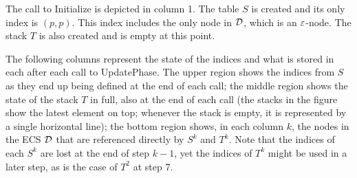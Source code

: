 \begin{example}
\begin{center}
	\end{center}
	The call to {\sc Initialize} is depicted in column 1. The table $S$ is created and its only index is $(p,p)$. This index includes the only node in $\mathcal{D}$, which is an $\varepsilon$-node. The stack $T$ is also created and is empty at this point.
	
	The following columns represent the state of the indices and what is stored in each after each call to {\sc UpdatePhase}. The upper region shows the indices from $S$ as they end up being defined at the end of each call; the middle region shows the state of the stack $T$ in full, also at the end of each call (the stacks in the figure show the latest element on top; whenever the stack is empty, it is represented by a single horizontal line); the bottom region shows, in each column $k$, the nodes in the ECS $\mathcal{D}$ that are referenced directly by $S^k$ and $T^k$. Note that the indices of each $S^k$ are lost at the end of step $k-1$, yet the indices of $T^k$ might be used in a later step, as is the case of $T^2$ at step 7.
	

\end{example}
